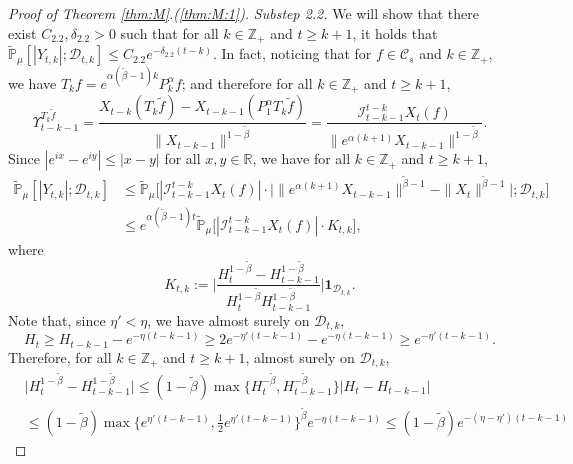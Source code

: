 \documentclass[EJP]{ejpecp} %
\begin{document}
\begin{proof}[Proof of Theorem \ref{thm:M}.(\ref{thm:M:1})]
  	\emph{Substep 2.2.} We will show that there exist $C_{2.2},\delta_{2.2} > 0$ such that for all $k\in \mathbb Z_+$ and $t\geq k+1$, it holds that $ \mathbb{\widetilde{P}}_{\mu} [|Y_{t,k}|;\mathcal{D}_{t,k}] \leq  C_{2.2} e^{-\delta_{2.2} (t-k)}$.
  	In fact, noticing that for $f\in \mathcal C_s$ and $k\in \mathbb Z_+$, we have $T_kf = e^{\alpha (\tilde \beta - 1 )k}P_k^\alpha f $; and therefore for all $k\in \mathbb Z_+$ and $t \geq k + 1$,
\begin{equation}
\label{eq:gammafunction11}
    \Upsilon_{t-k-1}^{T_{k} \tilde f}
    = \frac{X_{t-k}(T_{k} \tilde  f) - X_{t -k-1}(P_1^\alpha T_{k} \tilde f)}{\|X_{t-k-1}\|^{1-\tilde \beta}}
    = \frac{\mathcal I_{t - k - 1}^{t - k} X_t(f)}{\|e^{\alpha (k+1)}X_{t-k-1} \|^{1 -\tilde \beta}}.
\end{equation}
Since $|e^{ix}-e^{iy}|\leq|x-y|$ for all $x,y\in \mathbb R$, we have for all $k \in \mathbb Z_+$ and $t\geq k+1$,
\begin{align}
\label{eq: control of Ykt}
    \mathbb{\widetilde{P}}_{\mu}[|Y_{t,k}|;\mathcal{D}_{t,k}]
    & \leq \mathbb{\widetilde{P}}_{\mu}\Big[|\mathcal I_{t-k-1}^{t-k} X_t(f) | \cdot \Big| \| e^{\alpha(k+1)}X_{t-k-1}\| ^{ \tilde \beta - 1} - \|X_t\|^{ \tilde \beta - 1}\Big|; \mathcal D_{t,k}\Big] \\
    & \leq  e^{\alpha(\tilde \beta - 1)t}\mathbb{\widetilde{P}}_{\mu}\big[|\mathcal I_{t-k-1}^{t-k}X_t(f)|\cdot K_{t,k}\big],
\end{align}
where
\[
    K_{t,k}
    := \Big| \frac {H_t^{1- \tilde \beta} - H_{t-k-1}^{1 - \tilde \beta}} {H_t^{1 - \tilde \beta} H_{t-k-1}^{ 1- \tilde \beta }} \Big| \mathbf{1}_{\mathcal{D}_{t,k}}.
\]
	Note that, since $\eta' < \eta$, we have almost surely on $\mathcal D_{t,k}$,
\[
 	H_t
	\geq H_{t-k-1}- e^{-\eta (t-k-1)}
   	\geq 2e^{-\eta'(t-k-1)}-e^{-\eta(t-k-1)}
   	\geq e^{-\eta'(t-k-1)}.
\]
  	Therefore, for all $k \in \mathbb Z_+$ and $t\geq k+1$, almost surely  on $\mathcal D_{t,k}$,
\begin{align}
    & \Big|H_t^{1- \tilde \beta}-H_{t-k-1}^{1- \tilde \beta}\Big|
   	\leq (1- \tilde \beta) \max \{ H_t^{-\tilde \beta }, H_{t-k-1}^{ -\tilde \beta} \} | H_t - H_{t-k-1} | \\
    & \leq (1- \tilde \beta ) \max\{e^{\eta' (t-k-1)}, \frac{1}{2}e^{\eta'(t-k-1)}\}^{\tilde \beta} e^{-\eta(t-k-1)}  \leq (1- \tilde \beta) e^{-(\eta - \eta') (t-k-1)}

\end{align}
\end{proof}
\end{document}
